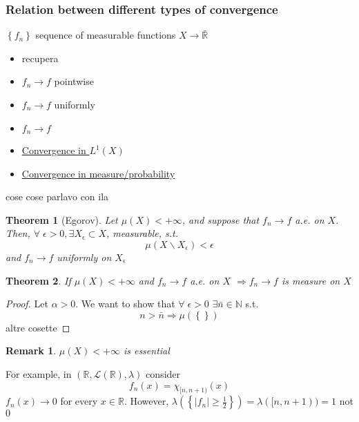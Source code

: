 \documentclass[a4paper,12pt]{article}
\theoremstyle{break}
\newtheorem{theorem}{Theorem}[section]
\newtheorem{remark}[section]{Remark}
\numberwithin{equation}{section}
\begin{document}
\subsubsection*{Relation between different types of convergence}
\(\left\lbrace f_n \right\rbrace\) sequence of measurable functions \(X \to \bar{\mathbb{R}}\)
\begin{itemize}
    \item recupera
    \item \(f_n \to f\) pointwise
    \item \(f_n \to f\) uniformly
    \item \(f_n \to f\)
    \item \underline{Convergence in \(L^1(X)\)}
    \item \underline{Convergence in measure/probability}
\end{itemize}
cose cose parlavo con ila 
\begin{theorem}[Egorov]
    Let \(\mu(X) < +\infty\), and suppose that \(f_n \to f\) a.e. on \(X\). Then, \(\forall \; \epsilon > 0, \exists X_{\epsilon} \subset X\), measurable, s.t. 
    \[
        \mu(X \backslash X_{\epsilon}) < \epsilon
    \]
    and \(f_n \to f\) uniformly on \(X_{\epsilon}\)
\end{theorem}
\begin{theorem}
    If \(\mu(X) < +\infty\) and \(f_n \to f\) a.e. on \(X\) \(\Longrightarrow f_n \to f\) is measure on \(X\)
\end{theorem}
\begin{proof}
    Let \(\alpha > 0\). We want to show that \(\forall \; \epsilon > 0\) \(\exists \bar{n} \in \mathbb{N}\) s.t. 
    \[
        n > \bar{n} \Longrightarrow \mu(\left\lbrace \right\rbrace)
    \]
    altre cosette 
\end{proof}
\begin{remark}
    \(\mu(X) < +\infty\) is essential
\end{remark}
For example, in \((\mathbb{R}, \mathcal{L}(\mathbb{R}), \lambda)\) consider
\[
    f_n (x) = \chi_{[n, n+1)}(x)
\]
\(f_n(x) \to 0\) for every \(x \in \mathbb{R}\). However, \(\lambda(\left\lbrace \vert f_n \vert \geq \frac{1}{2}\right\rbrace) = \lambda([n, n+1)) = 1\) not \(0\)
\end{document}
